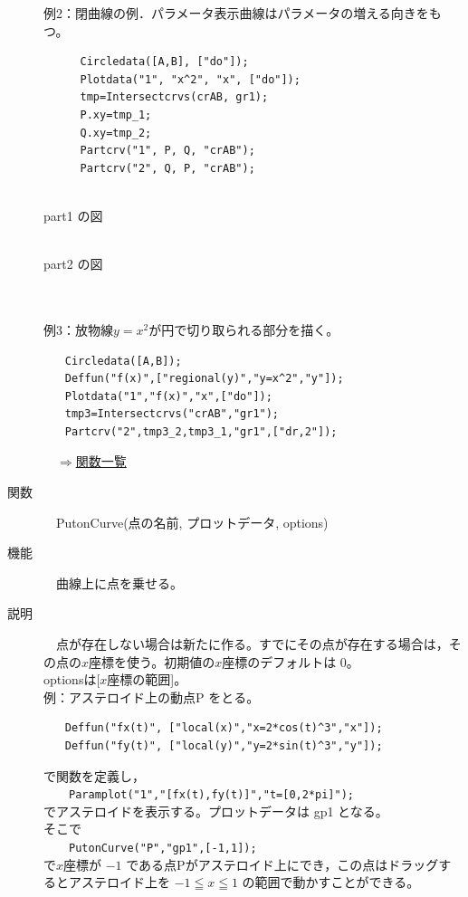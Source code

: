 \documentclass[papersize,a4paper,12pt,uplatex]{jsarticle}
\begin{document}
\begin{description}
例2：閉曲線の例．パラメータ表示曲線はパラメータの増える向きをもつ。
\begin{verbatim}
　    Circledata([A,B], ["do"]);
   　 Plotdata("1", "x^2", "x", ["do"]);
    　tmp=Intersectcrvs(crAB, gr1);
    　P.xy=tmp_1;
    　Q.xy=tmp_2;
    　Partcrv("1", P, Q, "crAB");
    　Partcrv("2", Q, P, "crAB");
\end{verbatim}
\vspace{5mm}

\begin{minipage}{45mm}
\begin{center}
\\
part1 の図
\end{center}
\end{minipage}
\hspace{10mm}
\begin{minipage}{45mm}
\begin{center}
\\
part2 の図
\end{center}
\end{minipage}
\\
\\

例3：放物線$y=x^2$が円で切り取られる部分を描く。
\begin{verbatim}
　　Circledata([A,B]);
　　Deffun("f(x)",["regional(y)","y=x^2","y"]);
　　Plotdata("1","f(x)","x",["do"]);
　　tmp3=Intersectcrvs("crAB","gr1");
　　Partcrv("2",tmp3_2,tmp3_1,"gr1",["dr,2"]);
\end{verbatim}


\begin{flushright}　\hyperlink{functionlist}{$\Rightarrow$関数一覧}\end{flushright}


\hypertarget{putoncurve}{}
\item[関数]　PutonCurve(点の名前, プロットデータ, options)
\item[機能]　曲線上に点を乗せる。
\item[説明]　点が存在しない場合は新たに作る。すでにその点が存在する場合は，その点の$x$座標を使う。初期値の$x$座標のデフォルトは 0。\\
optionsは[$x$座標の範囲]。\\

例：アステロイド上の動点P をとる。
\begin{verbatim}
　　Deffun("fx(t)", ["local(x)","x=2*cos(t)^3","x"]);
　　Deffun("fy(t)", ["local(y)","y=2*sin(t)^3","y"]);
\end{verbatim}
で関数を定義し，\\
　　\verb|Paramplot("1","[fx(t),fy(t)]","t=[0,2*pi]");|\\
でアステロイドを表示する。プロットデータは gp1 となる。\\
そこで\\
　　\verb|PutonCurve("P","gp1",[-1,1]); |\\
で$x$座標が $-1$ である点Pがアステロイド上にでき，この点はドラッグするとアステロイド上を $-1 \leqq x\leqq 1$ の範囲で動かすことができる。\\


\end{description}
\end{document}
